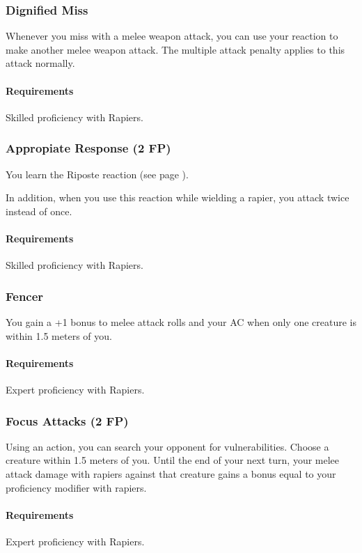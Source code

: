 \subsubsection{Dignified Miss} \label{feat::dignifiedmiss}
    Whenever you miss with a melee weapon attack, you can use your reaction to make another melee weapon attack.
    The multiple attack penalty applies to this attack normally.
    \paragraph{Requirements} Skilled proficiency with Rapiers.
\subsubsection{Appropiate Response (2 FP)} \label{feat::appropiateresponse}
    You learn the Riposte reaction (see page \pageref{act::riposte}).

    In addition, when you use this reaction while wielding a rapier, you attack twice instead of once.
    \paragraph{Requirements} Skilled proficiency with Rapiers.
\subsubsection{Fencer} \label{feat::fencer}
    You gain a +1 bonus to melee attack rolls and your AC when only one creature is within 1.5 meters of you.
    \paragraph{Requirements} Expert proficiency with Rapiers.
\subsubsection{Focus Attacks (2 FP)} \label{feat::focusattacks}
    Using an action, you can search your opponent for vulnerabilities.
    Choose a creature within 1.5 meters of you.
    Until the end of your next turn, your melee attack damage with rapiers against that creature gains a bonus equal to your proficiency modifier with rapiers.
    \paragraph{Requirements} Expert proficiency with Rapiers.
